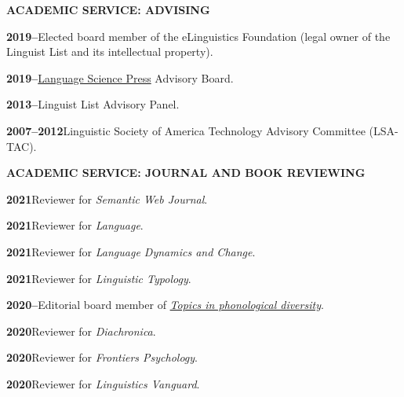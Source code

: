 \documentclass[11pt]{article}
\newcommand{\hangpara}{
 \setlength{\parindent}{0in} %
 \hangindent=0.42in %
}
\begin{document}
\vskip 20pt
\begin{flushleft}
{\bf ACADEMIC SERVICE: ADVISING}
\end{flushleft}

\hangpara
{\bf 2019--}\hspace{1ex}Elected board member of the eLinguistics Foundation (legal owner of the Linguist List and its intellectual property).

\vskip 6pt
\hangpara
{\bf 2019--}\hspace{1ex}\href{https://langsci-press.org/}{Language Science Press} Advisory Board.

\vskip 6pt
\hangpara
{\bf 2013--}\hspace{1ex}Linguist List Advisory Panel.

\vskip 6pt
\hangpara
{\bf 2007--2012}\hspace{1ex}Linguistic Society of America Technology Advisory Committee (LSA-TAC).


\vskip 20pt
\begin{flushleft}
{\bf ACADEMIC SERVICE: JOURNAL AND BOOK REVIEWING}
\end{flushleft}


\hangpara
{\bf 2021}\hspace{1ex}Reviewer for \textit{Semantic Web Journal}.

\hangpara
\vskip 6pt
{\bf 2021}\hspace{1ex}Reviewer for \textit{Language}.

\vskip 6pt
\hangpara
{\bf 2021}\hspace{1ex}Reviewer for \textit{Language Dynamics and Change}.

\vskip 6pt
\hangpara
{\bf 2021}\hspace{1ex}Reviewer for \textit{Linguistic Typology}.

\vskip 6pt
\hangpara
{\bf 2020--}\hspace{1ex}Editorial board member of \textit{\href{https://langsci-press.org/catalog/series/tpd}{Topics in phonological diversity}}.

\vskip 6pt
\hangpara
{\bf 2020}\hspace{1ex}Reviewer for \textit{Diachronica}.

\vskip 6pt
\hangpara
{\bf 2020}\hspace{1ex}Reviewer for \textit{Frontiers Psychology}.

\vskip 6pt
\hangpara
{\bf 2020}\hspace{1ex}Reviewer for \textit{Linguistics Vanguard}.
\end{document}
